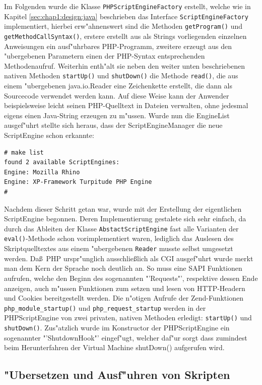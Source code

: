 Im Folgenden wurde die Klasse \texttt{PHPScriptEngineFactory} erstellt, welche wie in Kapitel
\ref{sec:chap1:design:java} beschrieben
das Interface \texttt{ScriptEngineFactory} implementiert, hierbei erw"ahnenswert sind die Methoden 
\texttt{getProgram()} und \texttt{getMethodCallSyntax()}, erstere erstellt aus als Strings vorliegenden
einzelnen Anweisungen ein ausf"uhrbares PHP-Programm, zweitere erzeugt aus den "ubergebenen Parametern
einen der PHP-Syntax entsprechenden Methodenaufruf. Weiterhin enth"alt sie neben den weiter unten
beschriebenen nativen Methoden \texttt{startUp()} und \texttt{shutDown()} die Methode \texttt{read()}, die
aus einem "ubergebenen java.io.Reader eine Zeichenkette erstellt, die dann als Sourcecode verwendet
werden kann. Auf diese Weise kann der Anwender beispielsweise leicht seinen PHP-Quelltext in Dateien
verwalten, ohne jedesmal eigens einen Java-String erzeugen zu m"ussen.
Wurde nun die EngineList ausgef"uhrt stellte sich heraus, dass der ScriptEngineManager die neue ScriptEngine schon erkannte:
\begin{lstlisting}[caption=Neue ScriptEngine]
# make list
found 2 available ScriptEngines:
Engine: Mozilla Rhino
Engine: XP-Framework Turpitude PHP Engine
#
\end{lstlisting}

Nachdem dieser Schritt getan war, wurde mit der Erstellung der eigentlichen ScriptEngine begonnen. Deren
Implementierung gestalete sich sehr einfach, da durch das Ableiten der Klasse \texttt{AbstactScriptEngine} 
fast alle Varianten der \texttt{eval()}-Methode schon vorimplementiert waren, lediglich das Auslesen des
Skriptquelltextes aus einem "ubergebenen \texttt{Reader} musste selbst umgesetzt werden. 
Da\ss\ PHP urspr"unglich ausschlie\ss lich als CGI ausgef"uhrt wurde merkt man dem Kern der Sprache noch
deutlich an. So muss eine SAPI Funktionen aufrufen, welche den Beginn des sogenannten "'Requests"', respektive
dessen Ende anzeigen, auch m"ussen Funktionen zum setzen und lesen von HTTP-Headern und Cookies bereitgestellt
werden. Die n"otigen Aufrufe der Zend-Funktionen \texttt{php\_module\_startup()} und \texttt{php\_request\_startup}
werden in der PHPScriptEngine von zwei privaten, nativen Methoden erledigt: \texttt{startUp()} und \texttt{shutDown()}. 
Zus"atzlich wurde im Konstructor der PHPScriptEngine ein sogenannter "'ShutdownHook"' eingef"ugt, welcher daf"ur 
sorgt dass zumindest beim Herunterfahren der Virtual Machine shutDown() aufgerufen wird.

\subsection{"Ubersetzen und Ausf"uhren von Skripten}
\label{sec:chap1:impl:2}

